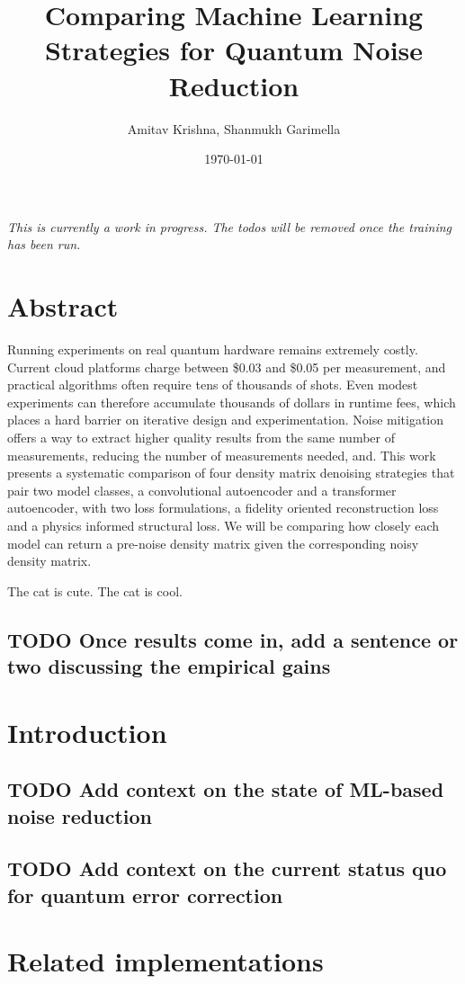 \documentclass[11pt]{article}
\author{Amitav Krishna, Shanmukh Garimella}
\date{\today}
\title{Comparing Machine Learning Strategies for Quantum Noise Reduction}
\begin{document}
\maketitle
\emph{This is currently a work in progress. The todos will be removed once the training has been run.}
\section{Abstract}
\label{sec:orge95fe63}
Running experiments on real quantum hardware remains extremely costly. Current cloud platforms charge between \$0.03 and \$0.05 per measurement, and practical algorithms often require tens of thousands of shots. Even modest experiments can therefore accumulate thousands of dollars in runtime fees, which places a hard barrier on iterative design and experimentation. Noise mitigation offers a way to extract higher quality results from the same number of measurements, reducing the number of measurements needed, and. This work presents a systematic comparison of four density matrix denoising strategies that pair two model classes, a convolutional autoencoder and a transformer autoencoder, with two loss formulations, a fidelity oriented reconstruction loss and a physics informed structural loss. We will be comparing how closely each model can return a pre-noise density matrix given the corresponding noisy density matrix.

The cat is cute. The cat is cool.
\subsection{{\bfseries\sffamily TODO} Once results come in, add a sentence or two discussing the empirical gains}
\label{sec:org260f41f}
\section{Introduction}
\label{sec:org7f65370}
\subsection{{\bfseries\sffamily TODO} Add context on the state of ML-based noise reduction}
\label{sec:org0e8ba81}
\subsection{{\bfseries\sffamily TODO} Add context on the current status quo for quantum error correction}
\label{sec:org3e28459}
\section{Related implementations}
\label{sec:org77d3073}
\end{document}
